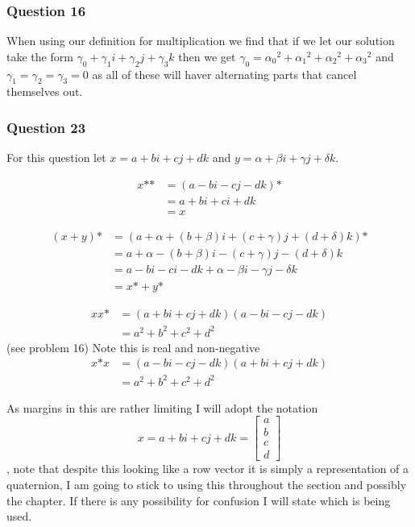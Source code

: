 \documentclass{article}
\begin{document}
\subsubsection{Question 16}
When using our definition for multiplication we find that if we let our solution take the form $\gamma_0+\gamma_1i+\gamma_2j+\gamma_3k$ then we get $\gamma_0 = {\alpha_0}^2+{\alpha_1}^2+{\alpha_2}^2+{\alpha_3}^2$ and $\gamma_1=\gamma_2=\gamma_3 = 0$ as all of these will haver alternating parts that cancel themselves out.

\subsubsection{Question 23}
For this question let $x = a+bi+cj+dk$ and $y = \alpha+\beta i+\gamma j + \delta k$.

\def\sop{\textbf{*}}

\begin{align*}
x\sop\sop &= (a-bi-cj-dk)\sop\\
& = a+bi+ci+dk \\
&= x
\end{align*}

\begin{align*}
(x+y)\sop &= (a+\alpha+(b+\beta)i+(c+\gamma)j+(d+\delta)k)\sop\\
&= a+\alpha-(b+\beta)i-(c+\gamma)j-(d+\delta)k \\
&= a-bi-ci-dk + \alpha-\beta i-\gamma j - \delta k \\
&= x\sop+y\sop
\end{align*}

\begin{align*}
xx\sop &= (a+bi+cj+dk)(a-bi-cj-dk) \\
&= a^2+b^2+c^2+d^2
\end{align*}
(see problem 16) Note this is real and non-negative
\begin{align*}
x\sop x&=(a-bi-cj-dk)(a+bi+cj+dk) \\
&= a^2+b^2+c^2+d^2
\end{align*}

 As margins in this are rather limiting I will adopt the notation $$x = a+bi+cj+dk = \left[\begin{matrix}
a\\b\\c\\d
\end{matrix}\right]$$, note that despite this looking like a row vector it is simply a representation of a quaternion, I am going to stick to using this throughout the section and possibly the chapter. If there is any possibility for confusion I will state which is being used.
\end{document}
